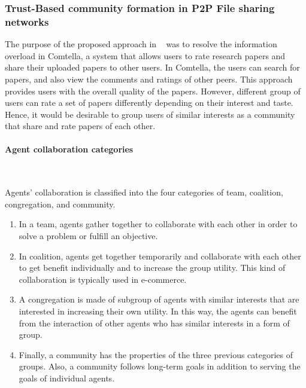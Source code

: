 \documentclass [12pt]{article} \usepackage{multicol}
\begin{document}
\begin{enumerate}
\end{enumerate}






	





\subsubsection{Trust-Based community formation in P2P File sharing networks}

The purpose of the proposed approach in ~\cite{wang2004trust} was to resolve the
information overload in Comtella, a system that allows users to rate
research papers and share their uploaded papers to other users. In
Comtella, the users can search for papers, and also view the comments
and ratings of other peers. This approach provides users with the
overall quality of the papers. However, different group of users can
rate a set of papers differently depending on their interest and
taste. Hence, it would be desirable to group users of similar
interests as a community that share and rate papers of each other. \newline

\paragraph{Agent collaboration categories}\mbox{}\\ \newline 


 Agents’ collaboration is classified into the four categories of
team, coalition, congregation, and community.

\begin{enumerate}
\item In a team, agents gather together to collaborate with each other in order to solve a
problem or fulfill an objective.
\item In coalition, agents get together temporarily and collaborate with each other to get benefit
individually and to increase the group utility. This kind of
collaboration is typically used in e-commerce.
\item A congregation is made of subgroup of agents with similar interests that are interested in
increasing their own utility. In this way, the agents can benefit
from the interaction of other agents who has similar interests in a
form of group.
\item Finally, a community has the properties of the three
previous categories of groups. Also, a community follows long-term
goals in addition to serving the goals of individual agents.
\end{enumerate}
\end{document}
